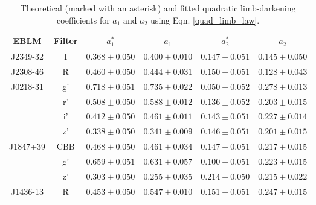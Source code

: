 \begin{table*}
\caption{Theoretical (marked with an asterisk) and fitted quadratic limb-darkening coefficients for  $a_1$ and $a_2$ using Eqn. \ref{quad_limb_law}.}              %
\label{quadratic_limb_darkening__table}      %
\centering                                    %
\begin{tabular}{c c c c c c}          %
\hline\hline 
EBLM   & Filter& $a_1^*$ & $a_1$ & $a_2^*$ & $a_2$ \\
\hline

J2349-32  & I & $0.368 \pm 0.050$  & $0.400 \pm 0.010$ & $0.147 \pm 0.051$ & $0.145 \pm 0.050$    \\


J2308-46 & R & $0.460 \pm 0.050$ & $0.444 \pm 0.031$ & $0.150 \pm 0.051$ & $0.128 \pm 0.043$ \\

J0218-31 & g' & $0.718 \pm 0.051$ & $0.735 \pm 0.022$ & $0.050 \pm 0.052$ & $0.278 \pm 0.013$\\
&          r' & $0.508 \pm 0.050$ & $0.588 \pm 0.012$ & $0.136 \pm 0.052$ & $0.203 \pm 0.015$\\
&          i' & $0.412 \pm 0.050$ & $0.461 \pm 0.011$ & $0.143 \pm 0.051$ & $0.227 \pm 0.014$ \\
&          z' & $0.338 \pm 0.050$ & $0.341 \pm 0.009$ & $0.146 \pm 0.051$ & $0.201 \pm 0.015$\\

J1847+39 & CBB & $0.468 \pm 0.050$ & $0.461 \pm 0.034$ & $0.147 \pm 0.051$ & $0.217 \pm 0.015$ \\
&          g'  & $0.659 \pm 0.051$ & $0.631 \pm 0.057$ & $0.100 \pm 0.051$ & $0.223 \pm 0.015$ \\
&		   z'  & $0.303 \pm 0.050$ & $0.255 \pm 0.035$ & $0.214 \pm 0.050$ & $0.215 \pm 0.022$\\
	
J1436-13 & R & $0.453 \pm 0.050$ & $0.547 \pm 0.010$ & $0.151 \pm 0.051$ & $0.247 \pm 0.015$\\

\hline
\end{tabular}
\end{table*}